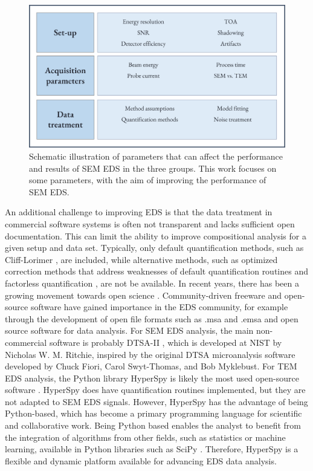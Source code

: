 \begin{figure}[!ht]
  \centering
  \includegraphics[width=0.8\linewidth]{figures/intro_parameters.png}
  \caption{
    Schematic illustration of parameters that can affect the performance and results of SEM EDS in the three groups.
    This work focuses on some parameters, with the aim of improving the performance of SEM EDS.
  }
  \label{fig:intro:parameters}
\end{figure}





An additional challenge to improving EDS is that the data treatment in commercial software systems is often not transparent and lacks sufficient open documentation.
This can limit the ability to improve compositional analysis for a given setup and data set.
Typically, only default quantification methods, such as Cliff-Lorimer \cite{CL1975}, are included, while alternative methods, such as optimized correction methods that address weaknesses of default quantification routines and factorless quantification \cite{nilsen_factorless_2021}, are not be available.
In recent years, there has been a growing movement towards open science \cite{opensource_2013}. %
Community-driven freeware and open-source software have gained importance in the EDS community, for example through the development of open file formats such as .msa and .emsa \cite{iso_emsa_22029} and open source software for data analysis.
For SEM EDS analysis, the main non-commercial software is probably DTSA-II \cite{dtsaii_1_getting_started}, which is developed at NIST by Nicholas W. M. Ritchie, inspired by the original DTSA microanalysis software developed by Chuck Fiori, Carol Swyt-Thomas, and Bob Myklebust.
For TEM EDS analysis, the Python library HyperSpy \cite{hyperspy_1.7.1} is likely the most used open-source software .
HyperSpy does have quantification routines implemented, but they are not adapted to SEM EDS signals.
However, HyperSpy has the advantage of being Python-based, which has become a primary programming language for scientific and collaborative work.
Being Python based enables the analyst to benefit from the integration of algorithms from other fields, such as statistics or machine learning, available in Python libraries such as SciPy \cite{2020SciPy}.
Therefore, HyperSpy is a flexible and dynamic platform available for advancing EDS data analysis.





